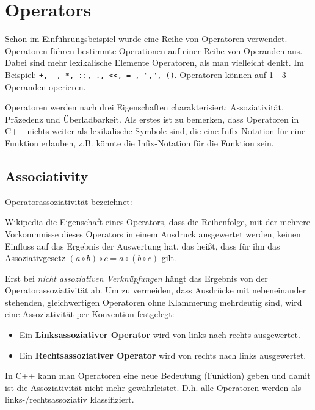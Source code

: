 
\section{Operators\label{sec:operator}}
Schon im Einführungsbeispiel wurde eine Reihe von Operatoren verwendet. Operatoren führen bestimmte Operationen auf einer Reihe von Operanden aus. Dabei sind mehr lexikalische Elemente Operatoren, als man vielleicht denkt. Im Beispiel: \texttt{+, -, *, ::, ., <<, = , ",", ()}. Operatoren können auf 1 - 3 Operanden operieren.

Operatoren werden nach drei Eigenschaften charakterisiert: Assoziativität, Präzedenz und Überladbarkeit. Als erstes ist zu bemerken, dass Operatoren in C++ nichts weiter als lexikalische Symbole sind, die eine Infix-Notation für eine Funktion erlauben, z.B. könnte  die Infix-Notation für die Funktion  sein.

\subsection{Associativity\label{sec:operator-associativity}}
Operatorassoziativität bezeichnet:

\begin{zitat}{Wikipedia}
    die Eigenschaft eines Operators, dass die Reihenfolge, mit der mehrere Vorkommnisse dieses Operators in einem Ausdruck ausgewertet werden, keinen Einfluss auf das Ergebnis der Auswertung hat, das heißt, dass für ihn das Assoziativgesetz $(a \circ b) \circ c = a \circ (b \circ c)$ gilt.
\end{zitat}

Erst bei \emph{nicht assoziativen Verknüpfungen} hängt das Ergebnis von der Operatorassoziativität ab. Um zu vermeiden, dass Ausdrücke mit nebeneinander stehenden, gleichwertigen Operatoren ohne Klammerung mehrdeutig sind, wird eine Assoziativität per Konvention festgelegt:
\begin{itemize}
\item Ein \textbf{Linksassoziativer Operator} wird von links nach rechts ausgewertet.
\item Ein \textbf{Rechtsassoziativer Operator} wird von rechts nach links ausgewertet.
\end{itemize}

In C++ kann man Operatoren eine neue Bedeutung (Funktion) geben und damit ist die Assoziativität
nicht mehr gewährleistet. D.h. alle Operatoren werden als links-/rechtsassoziativ klassifiziert.

